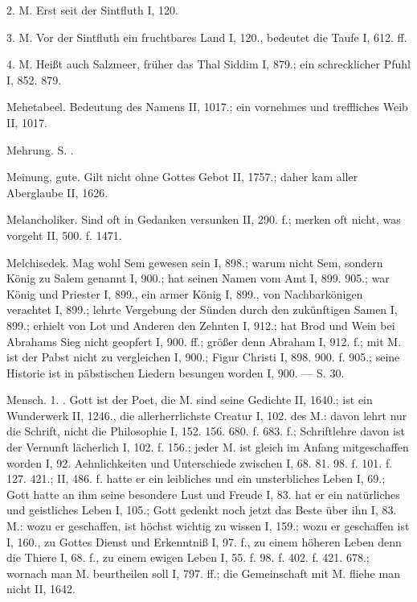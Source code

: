 2.  M. Erst seit der Sintfluth I, 120.

3.  M. Vor der Sintfluth ein fruchtbares Land I, 120., bedeutet die Taufe I, 612. ff.

4.  M. Heißt auch Salzmeer, früher das Thal Siddim I, 879.; ein schrecklicher Pfuhl I, 852. 879.

Mehetabeel. Bedeutung des Namens II, 1017.; ein vornehmes und treffliches Weib II, 1017.

Mehrung. S. .

Meinung, gute. Gilt nicht ohne Gottes Gebot II, 1757.; daher kam aller Aberglaube II, 1626.

Melancholiker. Sind oft in Gedanken versunken II, 290. f.; merken oft nicht, was vorgeht II, 500. f. 1471.

Melchisedek. Mag wohl Sem gewesen sein I, 898.; warum nicht Sem, sondern König zu Salem genannt I, 900.; hat seinen Namen vom Amt I, 899. 905.; war König und Priester I, 899., ein armer König I, 899., von Nachbarkönigen verachtet I, 899.; lehrte Vergebung der Sünden durch den zukünftigen Samen I, 899.; erhielt von Lot und Anderen den Zehnten I, 912.; hat Brod und Wein bei Abrahams Sieg nicht geopfert I, 900. ff.; größer denn Abraham I, 912. f.; mit M. ist der Pabst nicht zu vergleichen I, 900.; Figur Christi I, 898. 900. f. 905.; seine Historie ist in päbstischen Liedern besungen worden I, 900. — S.  30.

Mensch. 1. . Gott ist der Poet, die M. sind seine Gedichte II, 1640.; ist ein Wunderwerk II, 1246., die allerherrlichste Creatur I, 102.  des M.: davon lehrt nur die Schrift, nicht die Philosophie I, 152. 156. 680. f. 683. f.; Schriftlehre davon ist der Vernunft lächerlich I, 102. f. 156.; jeder M. ist gleich im Anfang mitgeschaffen worden I, 92. Aehnlichkeiten und Unterschiede zwischen  I, 68. 81. 98. f. 101. f. 127. 421.; II, 486. f.  hatte er ein leibliches und ein unsterbliches Leben I, 69.; Gott hatte an ihm seine besondere Lust und Freude I, 83.  hat er ein natürliches und geistliches Leben I, 105.; Gott gedenkt noch jetzt das Beste über ihn I, 83.  M.: wozu er geschaffen, ist höchst wichtig zu wissen I, 159.; wozu er geschaffen ist I, 160., zu Gottes Dienst und Erkenntniß I, 97. f., zu einem höheren Leben denn die Thiere I, 68. f., zu einem ewigen Leben I, 55. f. 98. f. 402. f. 421. 678.; wornach man M. beurtheilen soll I, 797. ff.; die Gemeinschaft mit M. fliehe man nicht II, 1642.

